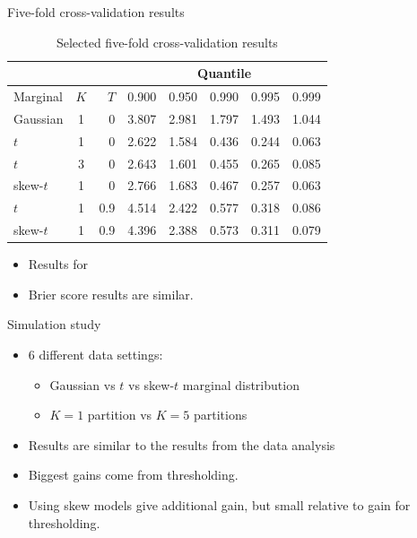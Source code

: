 \documentclass{beamer}
\begin{document}
\begin{frame}{Five-fold cross-validation results}
  \begin{table}[htbp]
    \small
    \centering
    \begin{tabular}{l|c|r|rrrrr}
          \multicolumn{3}{c}{\ } & \multicolumn{5}{c}{Quantile}\\
           \hline
  Marginal & $K$ & $T$  & 0.900 & 0.950 & 0.990 & 0.995 & 0.999\\
  \hline
Gaussian & 1 & 0 & 3.807 & 2.981 & 1.797 & 1.493 & 1.044\\
$t$ & 1 & 0 & 2.622 & 1.584 & 0.436 & 0.244 & 0.063 \\
$t$ & 3 & 0 & 2.643 & 1.601 & 0.455 & 0.265 & 0.085 \\
skew-$t$ & 1 & 0 & 2.766 & 1.683 & 0.467 & 0.257 & 0.063 \\
$t$ & 1 & 0.9 & 4.514 & 2.422 & 0.577 & 0.318 & 0.086 \\
skew-$t$ & 1 & 0.9 & 4.396 & 2.388 & 0.573 & 0.311 & 0.079 \\
\hline
    \end{tabular}
    \caption{Selected five-fold cross-validation results}
  \end{table}
  \begin{itemize}
  	\item Results for 
  	\item Brier score results are similar.
  \end{itemize}
\end{frame}

\begin{frame}{Simulation study}
  \begin{itemize} \setlength{\itemsep}{0.5em}
    \item 6 different data settings:
    \begin{itemize}
    	\item Gaussian vs $t$ vs skew-$t$ marginal distribution
        \item $K=1$ partition vs $K=5$ partitions
    \end{itemize}
    \item Results are similar to the results from the data analysis
    \item Biggest gains come from thresholding.
    \item Using skew models give additional gain, but small relative to gain for thresholding.
  \end{itemize}
\end{frame}
\end{document}
